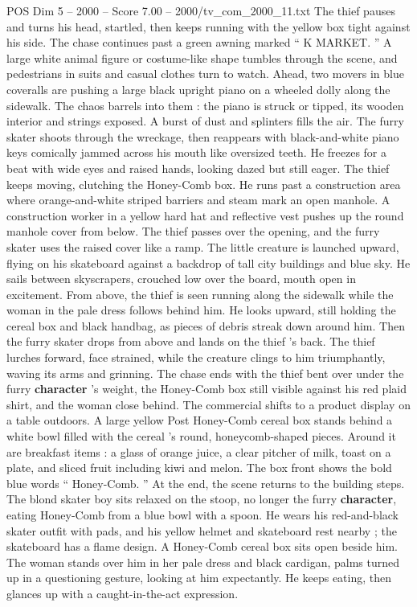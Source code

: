 \begin{textsample}{POS Dim 5 – 2000 – Score 7.00 – 2000/tv\_com\_2000\_11.txt}
The thief pauses and turns his head, startled, then keeps running with the yellow box tight against his side.
The chase continues past a green awning marked “ K MARKET. ” A large white animal figure or costume-like shape tumbles through the scene, and pedestrians in suits and casual clothes turn to watch.
Ahead, two movers in blue coveralls are pushing a large black upright piano on a wheeled dolly along the sidewalk.
The chaos barrels into them : the piano is struck or tipped, its wooden interior and strings exposed.
A burst of dust and splinters fills the air.
The furry skater shoots through the wreckage, then reappears with black-and-white piano keys comically jammed across his mouth like oversized teeth.
He freezes for a beat with wide eyes and raised hands, looking dazed but still eager.
The thief keeps moving, clutching the Honey-Comb box.
He runs past a construction area where orange-and-white striped barriers and steam mark an open manhole.
A construction worker in a yellow hard hat and reflective vest pushes up the round manhole cover from below.
The thief passes over the opening, and the furry skater uses the raised cover like a ramp.
The little creature is launched upward, flying on his skateboard against a backdrop of tall city buildings and blue sky.
He sails between skyscrapers, crouched low over the board, mouth open in excitement.
From above, the thief is seen running along the sidewalk while the woman in the pale dress follows behind him.
He looks upward, still holding the cereal box and black handbag, as pieces of debris streak down around him.
Then the furry skater drops from above and lands on the thief ’s back.
The thief lurches forward, face strained, while the creature clings to him triumphantly, waving its arms and grinning.
The chase ends with the thief bent over under the furry \textbf{character} ’s weight, the Honey-Comb box still visible against his red plaid shirt, and the woman close behind.
The commercial shifts to a product display on a table outdoors.
A large yellow Post Honey-Comb cereal box stands behind a white bowl filled with the cereal ’s round, honeycomb-shaped pieces.
Around it are breakfast items : a glass of orange juice, a clear pitcher of milk, toast on a plate, and sliced fruit including kiwi and melon.
The box front shows the bold blue words “ Honey-Comb. ” At the end, the scene returns to the building steps.
The blond skater boy sits relaxed on the stoop, no longer the furry \textbf{character}, eating Honey-Comb from a blue bowl with a spoon.
He wears his red-and-black skater outfit with pads, and his yellow helmet and skateboard rest nearby ; the skateboard has a flame design.
A Honey-Comb cereal box sits open beside him.
The woman stands over him in her pale dress and black cardigan, palms turned up in a questioning gesture, looking at him expectantly.
He keeps eating, then glances up with a caught-in-the-act expression.

\end{textsample}
